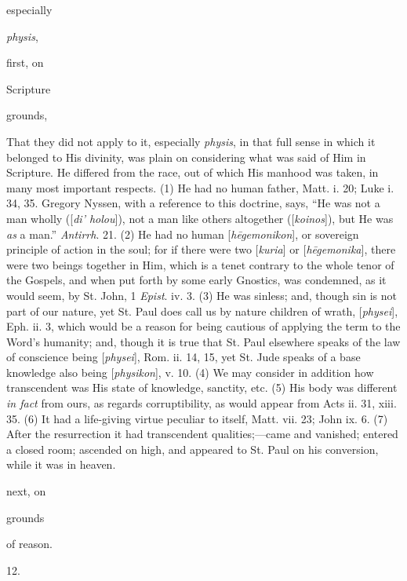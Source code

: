 especially 

\emph{physis},

first, on

Scripture

grounds,

That they did not apply to it, especially \emph{physis}, in
that full sense in which it belonged to His divinity, was
plain on considering what was said of Him in Scripture. He
differed from the race, out of which His manhood was taken, in
many most important respects. (1) He had no human father,
Matt. i. 20; Luke i. 34, 35. Gregory Nyssen, with a reference
to this doctrine, says, ``He was not a man wholly ([\emph{di'
holou}]), not a man like others altogether ([\emph{koinos}]),
but He was \emph{as} a man.'' \emph{Antirrh}. 21. (2) He had
no human [\emph{h\={e}gemonikon}], or sovereign principle
of action
in the soul; for if there were two [\emph{kuria}] or [\emph{h\={e}gemonika}],
there were two beings together in Him, which is a tenet
contrary to the whole tenor of the Gospels, and when put forth
by some early Gnostics, was condemned, as it would seem, by
St. John, 1 \emph{Epist}. iv. 3. (3) He was sinless; and,
though sin is not part of our nature, yet St. Paul does call
us by nature children of wrath, [\emph{physei}],
Eph. ii. 3, which would be a reason for being cautious of
applying the term to the Word's humanity; and, though it is
true that St. Paul elsewhere speaks of the law of conscience
being [\emph{physei}], Rom. ii. 14, 15, yet St. Jude speaks of
a base knowledge also being [\emph{physikon}], v. 10. (4) We
may consider in addition how transcendent was His state of
knowledge, sanctity, etc. (5) His body was different \emph{in
fact} from ours, as regards corruptibility, as would appear
from Acts ii. 31, xiii. 35. (6) It had a life-giving virtue
peculiar to itself, Matt. vii. 23; John ix. 6. (7) After the
resurrection it had transcendent qualities;—came and
vanished; entered a closed room; ascended on high, and
appeared to St. Paul on his conversion, while it was in
heaven.

next, on

grounds

of reason.

12.

